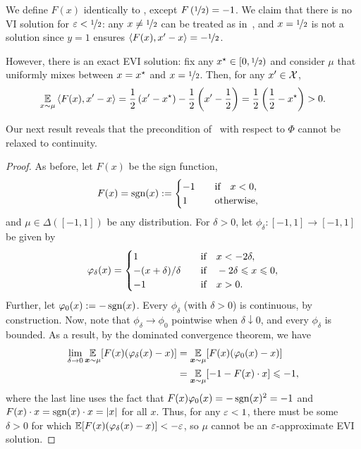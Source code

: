 \begin{example}
    We define $F(x)$ identically to , except $F\left(\nicefrac{1}{2}\right)=-1$. We claim that there is no VI solution for $\epsilon < \nicefrac{1}{2}$: any $x \neq \nicefrac{1}{2}$ can be treated as in~, and $x = \nicefrac{1}{2}$ is not a solution since $y= 1$ ensures $\ip{F(x), x' - x}= - \nicefrac{1}{2}$.

    However, there is an exact EVI solution: fix any $\xstar \in [0,\nicefrac{1}{2} )$ and consider $\mu$ that uniformly mixes between $x=\xstar$ and $x = \nicefrac{1}{2}$. Then, for any $x' \in \cX$,
    \begin{align*}
        \E_{x\sim\mu} \ip{F(x), x' - x}  =  \frac{1}{2} \left(x' -\xstar \right) - \frac{1}{2} \left(x' -\frac{1}{2} \right)= \frac{1}{2} \left(\frac{1}{2} -\xstar \right) > 0.
    \end{align*}
\end{example}

Our next result reveals that the precondition of~ with respect to $\Phi$ cannot be relaxed to continuity.

\countercont*

\begin{proof}
    As before, let $F(x)$ be the sign function, $$F(x) = \sgn(x) := \begin{cases} -1 &\qif x < 0, \\ 1 &\qq{otherwise,} \end{cases}$$ and $\mu \in \Delta([-1, 1])$ be any distribution. For $\delta > 0$, let $\phi_\delta : [-1, 1] \to [-1, 1]$ be given by 
    \begin{align*}
        \phi_\delta(x) = \begin{cases}
            1 &\qif x < -2\delta, \\
            - (x+\delta)/\delta &\qif -2\delta \le x \le 0, \\
            -1 &\qif x > 0.
        \end{cases}
    \end{align*}
    Further, let $\phi_0(x) := -\sgn(x)$. Every $\phi_\delta$ (with $\delta > 0$) is continuous, by construction. Now, note that $\phi_\delta \to \phi_0$ pointwise when $\delta \downarrow 0$, and every $\phi_\delta$ is bounded. As a result, by the dominated convergence theorem, we have
    \begin{align*}
        \lim_{\delta \to 0} \E_{\vx\sim\mu}[F(x) (\phi_\delta(x) - x)] &= \E_{\vx\sim\mu}[F(x) (\phi_0(x) - x)]
        \\&= \E_{\vx\sim\mu}[-1 - F(x) \cdot x] \le -1,
    \end{align*}
    where the last line uses the fact that $F(x) \phi_0(x) = -\sgn(x)^2 = -1$ and $F(x) \cdot x = \sgn(x)\cdot x = |x|$ for all $x$. Thus, for any $\eps < 1$, there must be some $\delta > 0$ for which $\E[F(x) (\phi_\delta(x) - x)] < -\eps$, so $\mu$ cannot be an $\eps$-approximate EVI solution.
\end{proof}

